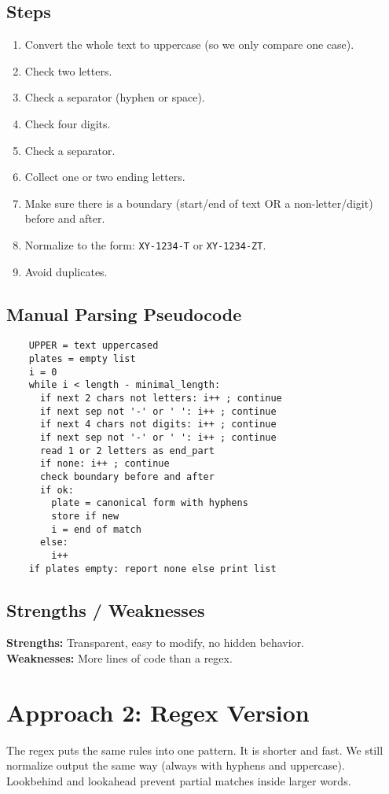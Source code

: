 \documentclass[12pt,a4paper]{article}
\begin{document}
\subsection{Steps}
\begin{enumerate}
    \item Convert the whole text to uppercase (so we only compare one case).
    \item Check two letters.
    \item Check a separator (hyphen or space).
    \item Check four digits.
    \item Check a separator.
    \item Collect one or two ending letters.
    \item Make sure there is a boundary (start/end of text OR a non-letter/digit) before and after.
    \item Normalize to the form: \texttt{XY-1234-T} or \texttt{XY-1234-ZT}.
    \item Avoid duplicates.
\end{enumerate}

\subsection{Manual Parsing Pseudocode}
\begin{verbatim}
    UPPER = text uppercased
    plates = empty list
    i = 0
    while i < length - minimal_length:
      if next 2 chars not letters: i++ ; continue
      if next sep not '-' or ' ': i++ ; continue
      if next 4 chars not digits: i++ ; continue
      if next sep not '-' or ' ': i++ ; continue
      read 1 or 2 letters as end_part
      if none: i++ ; continue
      check boundary before and after
      if ok:
        plate = canonical form with hyphens
        store if new
        i = end of match
      else:
        i++
    if plates empty: report none else print list
  \end{verbatim}

\subsection{Strengths / Weaknesses}
\textbf{Strengths:} Transparent, easy to modify, no hidden behavior. \\
\textbf{Weaknesses:} More lines of code than a regex.

\section{Approach 2: Regex Version}
The regex puts the same rules into one pattern. It is shorter and fast. We still normalize output the same way (always with hyphens and uppercase). Lookbehind and lookahead prevent partial matches inside larger words.
\end{document}
